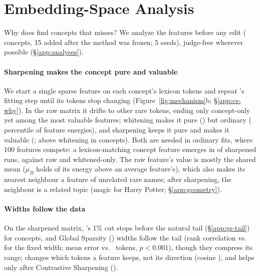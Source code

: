 \section{Embedding-Space Analysis}
\label{sec:analysis}

Why does \cinder{} find concepts that \ember{} misses?
We analyze the features before any edit ( concepts, 15 added after the method was frozen; 5 seeds), judge-free wherever possible (\S\ref{app:analyses}).

\paragraph{Sharpening makes the concept pure and valuable}
We start a single sparse feature on each concept's lexicon tokens and repeat \ember{}'s fitting step until its tokens stop changing (Figure~\ref{fig:mechanism}b; \S\ref{app:cs-why}).
In the raw matrix it drifts to other rare tokens, ending only  concept-only yet among the most valuable features; whitening makes it pure () but ordinary ( percentile of feature energies), and sharpening keeps it pure and makes it valuable (; above whitening in  concepts).
Both are needed in ordinary fits, where 100 features compete: a lexicon-matching concept feature emerges in  of sharpened runs, against  raw and  whitened-only.
The raw feature's value is mostly the shared mean ($\hat\mu_B$ holds  of its energy above an average feature's), which also makes its nearest neighbour a feature of unrelated rare names; after sharpening, the neighbour is a related topic (magic for Harry Potter; \S\ref{app:geometry}).

\paragraph{Widths follow the data}
On the sharpened matrix, \ember{}'s 1\% cut stops before the natural tail (\S\ref{app:gs-tail}) for  concepts, and Global Sparsity (\gs{}) widths follow the tail (rank correlation  vs.\  for the fixed width; mean error  vs.\  tokens, $p < 0.001$), though they compress its range; \gs{} changes which tokens a feature keeps, not its direction (cosine ), and helps only after Contrastive Sharpening (\cs{}).

